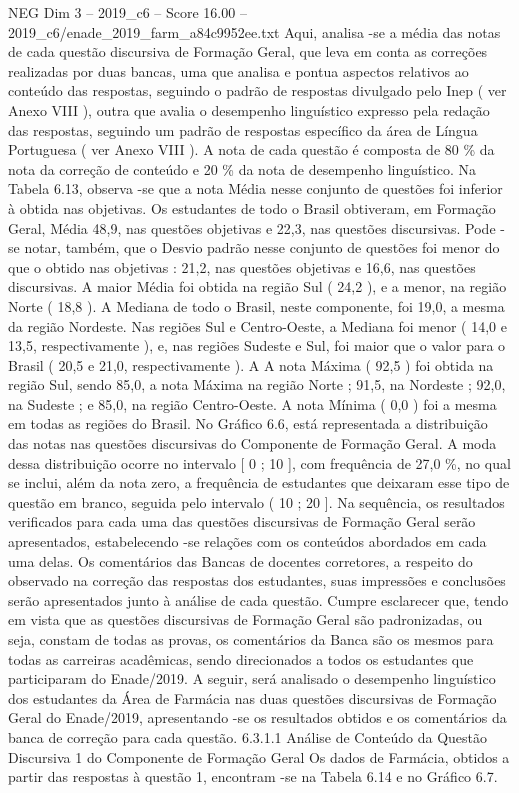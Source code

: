 \begin{textsample}{NEG Dim 3 – 2019\_c6 – Score 16.00 – 2019\_c6/enade\_2019\_farm\_a84c9952ee.txt}
Aqui, analisa -se a média das notas de cada questão discursiva de Formação Geral, que leva em conta as correções realizadas por duas bancas, uma que analisa e pontua aspectos relativos ao conteúdo das respostas, seguindo o padrão de respostas divulgado pelo Inep ( ver Anexo VIII ), outra que avalia o desempenho linguístico expresso pela redação das respostas, seguindo um padrão de respostas específico da área de Língua Portuguesa ( ver Anexo VIII ).
A nota de cada questão é composta de 80 \% da nota da correção de conteúdo e 20 \% da nota de desempenho linguístico.
Na Tabela 6.13, observa -se que a nota Média nesse conjunto de questões foi inferior à obtida nas objetivas.
Os estudantes de todo o Brasil obtiveram, em Formação Geral, Média 48,9, nas questões objetivas e 22,3, nas questões discursivas.
Pode -se notar, também, que o Desvio padrão nesse conjunto de questões foi menor do que o obtido nas objetivas : 21,2, nas questões objetivas e 16,6, nas questões discursivas.
A maior Média foi obtida na região Sul ( 24,2 ), e a menor, na região Norte ( 18,8 ).
A Mediana de todo o Brasil, neste componente, foi 19,0, a mesma da região Nordeste.
Nas regiões Sul e Centro-Oeste, a Mediana foi menor ( 14,0 e 13,5, respectivamente ), e, nas regiões Sudeste e Sul, foi maior que o valor para o Brasil ( 20,5 e 21,0, respectivamente ).
A A nota Máxima ( 92,5 ) foi obtida na região Sul, sendo 85,0, a nota Máxima na região Norte ; 91,5, na Nordeste ; 92,0, na Sudeste ; e 85,0, na região Centro-Oeste.
A nota Mínima ( 0,0 ) foi a mesma em todas as regiões do Brasil.
No Gráfico 6.6, está representada a distribuição das notas nas questões discursivas do Componente de Formação Geral.
A moda dessa distribuição ocorre no intervalo [ 0 ; 10 ], com frequência de 27,0 \%, no qual se inclui, além da nota zero, a frequência de estudantes que deixaram esse tipo de questão em branco, seguida pelo intervalo ( 10 ; 20 ].
Na sequência, os resultados verificados para cada uma das questões discursivas de Formação Geral serão apresentados, estabelecendo -se relações com os conteúdos abordados em cada uma delas.
Os comentários das Bancas de docentes corretores, a respeito do observado na correção das respostas dos estudantes, suas impressões e conclusões serão apresentados junto à análise de cada questão.
Cumpre esclarecer que, tendo em vista que as questões discursivas de Formação Geral são padronizadas, ou seja, constam de todas as provas, os comentários da Banca são os mesmos para todas as carreiras acadêmicas, sendo direcionados a todos os estudantes que participaram do Enade/2019.
A seguir, será analisado o desempenho linguístico dos estudantes da Área de Farmácia nas duas questões discursivas de Formação Geral do Enade/2019, apresentando -se os resultados obtidos e os comentários da banca de correção para cada questão. 6.3.1.1 Análise de Conteúdo da Questão Discursiva 1 do Componente de Formação Geral Os dados de Farmácia, obtidos a partir das respostas à questão 1, encontram -se na Tabela 6.14 e no Gráfico 6.7.

\end{textsample}
